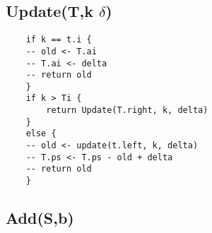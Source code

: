 \documentclass[12pt]{article}
\begin{document}
	\subsection*{Update(T,k $\delta$)}
	\begin{verbatim}
	if k == t.i {
	-- old <- T.ai
	-- T.ai <- delta
	-- return old
	}
	if k > Ti {
		return Update(T.right, k, delta)
	}
	else {
	-- old <- update(t.left, k, delta)
	-- T.ps <- T.ps - old + delta
	-- return old
	}
	\end{verbatim}
	
	\subsection*{Add(S,b)}
	
	
	
\end{document}
